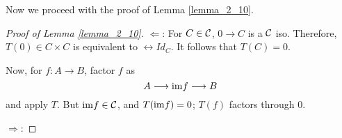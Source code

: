 Now we proceed with the proof of Lemma \ref{lemma_2_10}.

\begin{proof}[Proof of Lemma \ref{lemma_2_10}]
\noindent $\Leftarrow$: For $C \in \mathcal{C}$, $0 \to C$ is
a $\mathcal{C}$ iso. Therefore, $T(0) \in C \times C$ is
equivalent to $\rel{Id}_C$. It follows that $T(C) = 0$.

Now, for $f: A \to B$, factor $f$ as
\[
A \longrightarrow \mathrm{im} f \longrightarrow B
\]
and apply $T$. But $\mathrm{im} f \in \mathcal{C}$, and $T(\mathrm{im} f) = 0$; 
$T(f)$ factors through $0$.

\noindent $\Rightarrow$:
\end{proof}
